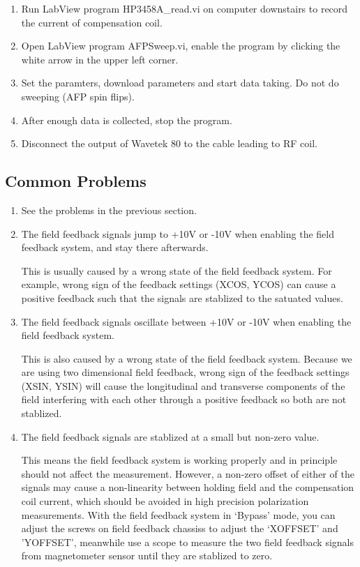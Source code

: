 {\begin{enumerate}
\item Run LabView program HP3458A\_read.vi on computer downstairs to record the current
of compensation coil.

\item Open LabView program AFPSweep.vi, enable the program by clicking the
white arrow in the upper left corner.

\item Set the paramters, download parameters
and start data taking.  Do not do sweeping (AFP spin flips).

\item After enough data is collected, stop the program.

\item Disconnect the output of Wavetek 80 to the cable leading to RF coil.

\end{enumerate}



\subsection{Common Problems}
\begin{enumerate}
\item See the problems in the previous section.

\item The field feedback signals jump to +10V or -10V when enabling the field feedback
system, and stay there afterwards.

This is usually caused by a wrong state of the field feedback system.  For example, wrong
sign of the feedback settings (XCOS, YCOS) can cause a positive feedback such that the 
signals are stablized to the satuated values.

\item The field feedback signals oscillate between +10V or -10V when enabling the field feedback
system.

This is also caused by a wrong state of the field feedback system.  Because we are using
two dimensional field feedback, wrong
sign of the feedback settings (XSIN, YSIN) will cause the longitudinal and transverse 
components of the field interfering with each other through a positive feedback so both
are not stablized.

\item The field feedback signals are stablized at a small but non-zero value.

This means the field feedback system is working properly and in principle should not
affect the measurement.  However, a non-zero offset of either of the signals may cause
a non-linearity between holding field and the compensation coil current, which should
be avoided in high precision polarization measurements.  With the field feedback 
system in `Bypass' mode, you can adjust the screws on 
field feedback chassiss to adjust the `XOFFSET' and 'YOFFSET',
meanwhile use a scope to measure the two field feedback signals from magnetometer sensor
until they are stablized to zero.

\end{enumerate}

} %

